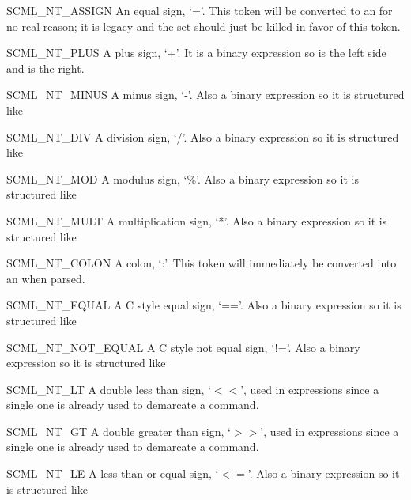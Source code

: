 \begin{cidentifierlist}
  \item[SCML_NT_ASSIGN]
  An equal sign, `='.  This token will be converted to an
   for no real reason; it is legacy and the set should
  just be killed in favor of this token.

  \item[SCML_NT_PLUS]
  A plus sign, `+'.  It is a binary expression so  is
  the left side and  is the right.

  \item[SCML_NT_MINUS]
  A minus sign, `-'.  Also a binary expression so it is structured like

  \item[SCML_NT_DIV]
  A division sign, `/'.  Also a binary expression so it is structured like

  \item[SCML_NT_MOD]
  A modulus sign, `\%'.  Also a binary expression so it is structured like

  \item[SCML_NT_MULT]
  A multiplication sign, `*'.  Also a binary expression so it is structured like

  \item[SCML_NT_COLON]
  A colon, `:'.  This token will immediately be converted into an
   when parsed.

  \item[SCML_NT_EQUAL]
  A C style equal sign, `=='.  Also a binary expression so it is structured like

  \item[SCML_NT_NOT_EQUAL]
  A C style not equal sign, `!='.  Also a binary expression so it is structured
  like 

  \item[SCML_NT_LT]
  A double less than sign, `$<<$', used in expressions since a single one is
  already used to demarcate a command.

  \item[SCML_NT_GT]
  A double greater than sign, `$>>$', used in expressions since a single one is
  already used to demarcate a command.

  \item[SCML_NT_LE]
  A less than or equal sign, `$<=$'.  Also a binary expression so it is structured
  like 


\end{cidentifierlist}
